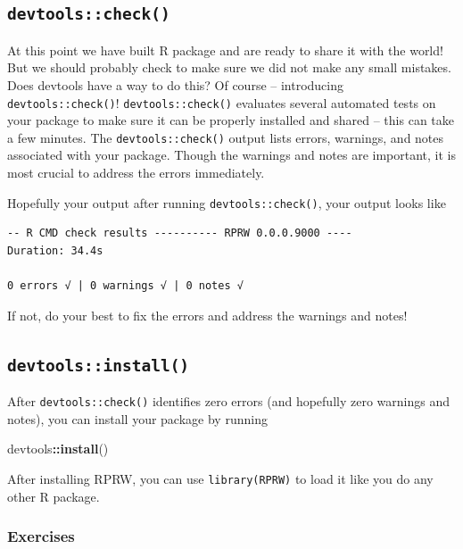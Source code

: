 \documentclass[
]{book}
\newenvironment{Shaded}{\begin{snugshade}}{\end{snugshade}}
\newcommand{\KeywordTok}[1]{\textcolor[rgb]{0.13,0.29,0.53}{\textbf{#1}}}
\newcommand{\NormalTok}[1]{#1}
\newcommand{\OperatorTok}[1]{\textcolor[rgb]{0.81,0.36,0.00}{\textbf{#1}}}
\begin{document}
\hypertarget{check}{%
\subsection{\texorpdfstring{\texttt{devtools::check()}}{devtools::check()}}\label{check}}

At this point we have built R package and are ready to share it with the world! But we should probably check to make sure we did not make any small mistakes. Does devtools have a way to do this? Of course -- introducing \texttt{devtools::check()}! \texttt{devtools::check()} evaluates several automated tests on your package to make sure it can be properly installed and shared -- this can take a few minutes. The \texttt{devtools::check()} output lists errors, warnings, and notes associated with your package. Though the warnings and notes are important, it is most crucial to address the errors immediately.

Hopefully your output after running \texttt{devtools::check()}, your output looks like

\begin{verbatim}
-- R CMD check results ---------- RPRW 0.0.0.9000 ----
Duration: 34.4s

0 errors √ | 0 warnings √ | 0 notes √
\end{verbatim}

If not, do your best to fix the errors and address the warnings and notes!

\hypertarget{install}{%
\subsection{\texorpdfstring{\texttt{devtools::install()}}{devtools::install()}}\label{install}}

After \texttt{devtools::check()} identifies zero errors (and hopefully zero warnings and notes), you can install your package by running

\begin{Shaded}
\begin{Highlighting}[]
\NormalTok{devtools}\OperatorTok{::}\KeywordTok{install}\NormalTok{()}
\end{Highlighting}
\end{Shaded}

After installing RPRW, you can use \texttt{library(RPRW)} to load it like you do any other R package.

\hypertarget{ex-set5}{%
\subsubsection{Exercises}\label{ex-set5}}
\end{document}
